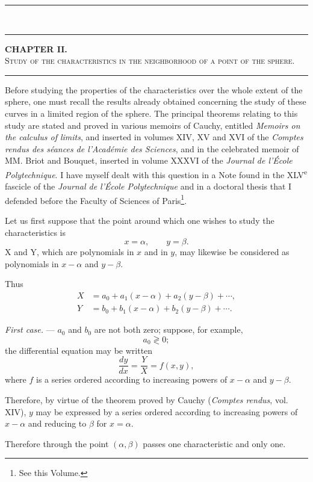\documentclass[11pt]{article}
\newcommand{\ornament}{\begin{center}\rule{2.5em}{0.4pt}\,\raisebox{0.1ex}{\tiny$\bullet\bullet\bullet$}\,\rule{2.5em}{0.4pt}\end{center}}
\newcommand{\shortline}{\begin{center}\rule{3.5em}{0.4pt}\end{center}}
\begin{document}
\ornament

\setcounter{footnote}{0}

\begin{center}
{\bfseries CHAPTER II.}\\[0.8em]
{\scshape Study of the characteristics in the neighborhood of a point of the sphere.}
\end{center}

\shortline

Before studying the properties of the characteristics over the whole extent of the sphere, one must recall the results already obtained concerning the study of these curves in a limited region of the sphere. The principal theorems relating to this study are stated and proved in various memoirs of Cauchy, entitled \emph{Memoirs on the calculus of limits}, and inserted in volumes XIV, XV and XVI of the \emph{Comptes rendus des séances de l’Académie des Sciences}, and in the celebrated memoir of MM. Briot and Bouquet, inserted in volume XXXVI of the \emph{Journal de l’École Polytechnique}. I have myself dealt with this question in a Note found in the XLV\textsuperscript{e} fascicle of the \emph{Journal de l’École Polytechnique} and in a doctoral thesis that I defended before the Faculty of Sciences of Paris\footnote{See this Volume.}.

Let us first suppose that the point around which one wishes to study the characteristics is
\[
x=\alpha,\qquad y=\beta.
\]
X and Y, which are polynomials in $x$ and in $y$, may likewise be considered as polynomials in $x-\alpha$ and $y-\beta$.

Thus
\[
\begin{aligned}
X&=a_0+a_1(x-\alpha)+a_2(y-\beta)+\cdots,\\
Y&=b_0+b_1(x-\alpha)+b_2(y-\beta)+\cdots.
\end{aligned}
\]

\emph{First case.} --- $a_0$ and $b_0$ are not both zero; suppose, for example,
\[
a_0\gtrless0;
\]
the differential equation may be written
\[
\frac{dy}{dx}=\frac{Y}{X}=f(x,y),
\]
where $f$ is a series ordered according to increasing powers of $x-\alpha$ and $y-\beta$.

Therefore, by virtue of the theorem proved by Cauchy (\emph{Comptes rendus}, vol. XIV), $y$ may be expressed by a series ordered according to increasing powers of $x-\alpha$ and reducing to $\beta$ for $x=\alpha$.

Therefore through the point $(\alpha,\beta)$ passes one characteristic and only one.
\end{document}
